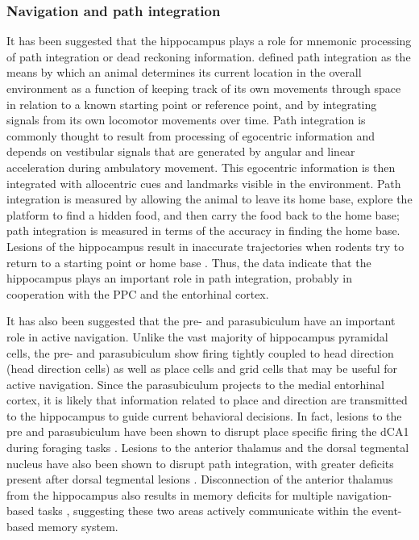 \documentclass[doc, longtable]{apa6}
\begin{document}
\subsubsection{Navigation and path integration}
It has been suggested that the hippocampus plays a role for mnemonic processing of path integration or dead reckoning information. \textcite{Whishaw1997a} defined path integration as the means by which an animal determines its current location in the overall environment as a function of keeping track of its own movements through space in relation to a known starting point or reference point, and by integrating signals from its own locomotor movements over time. Path integration is commonly thought to result from processing of egocentric information and depends on vestibular signals that are generated by angular and linear acceleration during ambulatory movement. This egocentric information is then integrated with allocentric cues and landmarks visible in the environment. Path integration is measured by allowing the animal to leave its home base, explore the platform to find a hidden food, and then carry the food back to the home base; path integration is measured in terms of the accuracy in finding the home base. Lesions of the hippocampus result in inaccurate trajectories when rodents try to return to a starting point or home base \parencite{Parron2004c, Save2001a, Whishaw1996b}. Thus, the data indicate that the hippocampus plays an important role in path integration, probably in cooperation with the PPC and the entorhinal cortex.

It has also been suggested that the pre- and parasubiculum have an important role in active navigation. Unlike the vast majority of hippocampus pyramidal cells, the pre- and parasubiculum show firing tightly coupled to head direction (head direction cells) as well as place cells and grid cells that may be useful for active navigation. Since the parasubiculum projects to the medial entorhinal cortex, it is likely that information related to place and direction are transmitted to the hippocampus to guide current behavioral decisions. In fact, lesions to the pre and parasubiculum have been shown to disrupt place specific firing the dCA1 during foraging tasks \parencite{Liu2001a, Liu2004a}. Lesions to the anterior thalamus and the dorsal tegmental nucleus have also been shown to disrupt path integration, with greater deficits present after dorsal tegmental lesions \parencite{Frohardt2006a}. Disconnection of the anterior thalamus from the hippocampus also results in memory deficits for multiple navigation-based tasks \parencite{Warburton2001a}, suggesting these two areas actively communicate within the event-based memory system.
\end{document}
